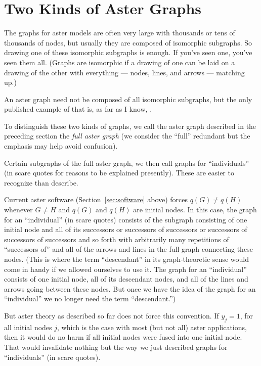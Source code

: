 \section{Two Kinds of Aster Graphs}

The graphs for aster models are often very large with thousands or tens of
thousands of nodes, but usually they are composed of isomorphic subgraphs.
So drawing one of these isomorphic subgraphs is enough.
If you've seen one, you've seen them all.
(Graphs are isomorphic if a drawing of one can be laid on a drawing of the
other with everything --- nodes, lines, and arrows --- matching up.)

An aster graph need not be composed of all isomorphic subgraphs,
but the only published example of that is, as far as I know,
\citet{aster-hornworm}.

To distinguish these two kinds of graphs, we call the aster graph described
in the preceding section the \emph{full aster graph} (we consider the ``full''
redundant but the emphasis may help avoid confusion).

Certain subgraphs of the full aster graph, we then call graphs
for ``individuals'' (in scare quotes for reasons to be explained presently).
These are easier to recognize than describe.

Current aster software (Section~\ref{sec:software} above) forces
$q(G) \neq q(H)$ whenever $G \neq H$ and $q(G)$ and $q(H)$ are initial nodes.
In this case, the graph for an ``individual'' (in scare quotes)
consists of the subgraph consisting of one initial node and all of its
successors or successors of successors or successors of successors
of successors and so forth with arbitrarily many repetitions
of ``successors of'' and all of the arrows and lines in the full graph
connecting these nodes.  (This is where the term ``descendant'' in its
graph-theoretic sense would
come in handy if we allowed ourselves to use it.  The graph for an
``individual'' consists of one initial node, all of its descendant nodes,
and all of the lines and arrows going between these nodes.  But once we
have the idea of the graph for an ``individual'' we no longer need the
term ``descendant.'')

But aster theory as described so far does not force this convention.
If $y_j = 1$, for all initial nodes $j$, which is the case with most
(but not all) aster applications, then it would do no harm if all initial
nodes were fused into one initial node.  That would invalidate nothing but
the way we just described graphs for ``individuals'' (in scare quotes).

